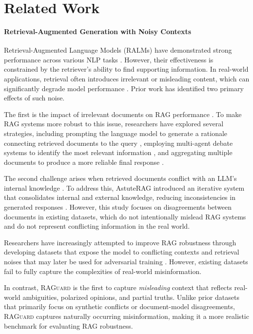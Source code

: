 \section{Related Work}
\paragraph{Retrieval-Augmented Generation with Noisy Contexts}
Retrieval-Augmented Language Models (RALMs) have demonstrated strong performance across various NLP tasks \citep{RAGPretrain, RAGNLP}. However, their effectiveness is constrained by the retriever’s ability to find supporting information. In real-world applications, retrieval often introduces irrelevant or misleading content, which can significantly degrade model performance \citep{relevance, yin2023alcunalargelanguagemodels, PowerOfNoise, xie2024adaptivechameleonstubbornsloth}. Prior work has identified two primary effects of such noise.

The first is the impact of irrelevant documents on RAG performance \citep{BenchmarkLM}. To make RAG systems more robust to this issue, researchers have explored several strategies, including prompting the language model to generate a rationale connecting retrieved documents to the query \citep{InstructRAG}, employing multi-agent debate systems to identify the most relevant information \citep{LearningToBreak}, and aggregating multiple documents to produce a more reliable final response \citep{RobustRAG}.

The second challenge arises when retrieved documents conflict with an LLM’s internal knowledge \citep{ContextMemoryConflict}. To address this, AstuteRAG introduced an iterative system that consolidates internal and external knowledge, reducing inconsistencies in generated responses \citep{AstuteRAG}. However, this study focuses on disagreements between documents in existing datasets, which do not intentionally mislead RAG systems and do not represent conflicting information in the real world.

Researchers have increasingly attempted to improve RAG robustness through developing datasets that expose the model to conflicting contexts \cite{qacc, PowerOfNoise} and retrieval noises \cite{NoiserBench} that may later be used for adversarial training \cite{raat}. However, existing datasets fail to fully capture the complexities of real-world misinformation. 


In contrast, \textsc{RAGuard} is the first to capture \textit{misleading} context that reflects real-world ambiguities, polarized opinions, and partial truths. Unlike prior datasets that primarily focus on synthetic conflicts or document-model disagreements, \textsc{RAGuard} captures naturally occurring misinformation, making it a more realistic benchmark for evaluating RAG robustness. 

